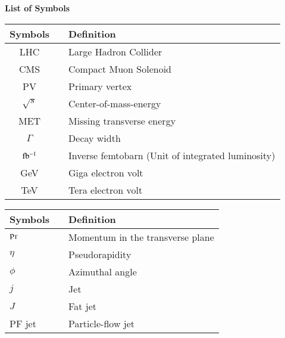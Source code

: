 \vspace{0.2cm}
{\Large{\bf List of Symbols}}\\
\vskip 0.2cm
\begin{tabular}{ccl}\hline
{\bf Symbols}&\hspace{1cm} & {\bf Definition}\\ \hline\hline
LHC && Large Hadron Collider\\
CMS && Compact Muon Solenoid\\
PV && Primary vertex\\
$\sqrt{s}$ & & Center-of-mass-energy\\
MET & & Missing transverse energy\\
$\Gamma$ && Decay width\\
$\rm fb^{-1}$ && Inverse femtobarn (Unit of integrated luminosity) \\
GeV & & Giga electron volt \\
TeV & & Tera electron volt \\
\hline
\end{tabular}

\begin{tabular}{lcl}\hline
{\bf Symbols}&\hspace{2cm} & {\bf Definition}\\ \hline\hline
$\rm p_T$ && Momentum in the transverse plane\\
$\eta$ && Pseudorapidity\\
$\phi$ && Azimuthal angle\\
$j$ && Jet\\
$J$ && Fat jet\\
PF jet  && Particle-flow jet\\
\hline
\end{tabular}





